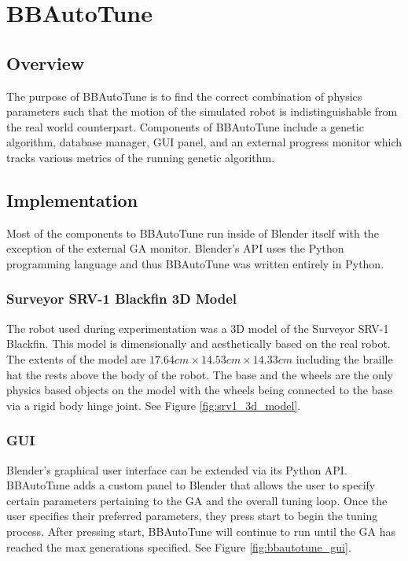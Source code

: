 \chapter{BBAutoTune}

\label{Chapter4}

\section{Overview}

The purpose of BBAutoTune is to find the correct combination of physics parameters such that the motion of the simulated robot is indistinguishable from the real world counterpart. Components of BBAutoTune include a genetic algorithm, database manager, GUI panel, and an external progress monitor which tracks various metrics of the running genetic algorithm.  

\section{Implementation}

Most of the components to BBAutoTune run inside of Blender itself with the exception of the external GA monitor. Blender's API uses the Python programming language and thus BBAutoTune was written entirely in Python. 

\subsection{Surveyor SRV-1 Blackfin 3D Model}

The robot used during experimentation was a 3D model of the Surveyor SRV-1 Blackfin. This model is dimensionally and aesthetically based on the real robot. The extents of the model are $17.64cm\times14.53cm\times14.33cm$ including the braille hat the rests above the body of the robot. The base and the wheels are the only physics based objects on the model with the wheels being connected to the base via a rigid body hinge joint. See Figure \ref{fig:srv1_3d_model}.

\subsection{GUI}

Blender's graphical user interface can be extended via its Python API. BBAutoTune adds a custom panel to Blender that allows the user to specify certain parameters pertaining to the GA and the overall tuning loop. Once the user specifies their preferred parameters, they press start to begin the tuning process. After pressing start, BBAutoTune will continue to run until the GA has reached the max generations specified. See Figure \ref{fig:bbautotune_gui}. 

